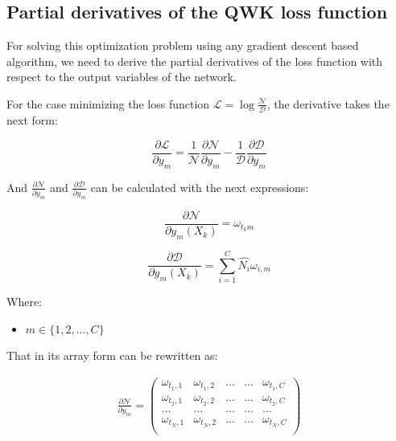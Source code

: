 \documentclass[times,twocolumn,final,authoryear]{elsarticle}
\begin{document}
\subsection{Partial derivatives of the QWK loss function}

For solving this optimization problem using any gradient descent based algorithm, we need to derive the partial derivatives of the loss function with respect to the output variables of the network. 

For the case minimizing the loss function $\mathcal{L} = \log{ \frac{\mathcal{N}}{\mathcal{D}}}$, the derivative takes the next form:

\begin{equation}
\frac{\partial \mathcal{L}}{\partial y_m} = \frac{1}{\mathcal{N}}\frac{\partial \mathcal{N}}{\partial y_m} - \frac{1}{\mathcal{D}}
\frac{\partial{\mathcal{D}}}{\partial y_m}
\end{equation}

And $\frac{\partial \mathcal{N}}{\partial y_m}$ and $\frac{\partial{\mathcal{D}}}{\partial y_m}$ can be calculated with the next expressions:

\begin{equation}
\frac{\partial \mathcal{N}}{\partial y_m(X_k)} = \omega_{t_k m}
\end{equation}

\begin{equation}
\frac{\partial \mathcal{D}}{\partial y_m(X_k)} = \sum_{i=1}^{C} \hat{N_i} \omega_{i,m}
\end{equation}

Where: 
\begin{itemize}
\item[] $m \in \{1, 2, ..., C\}$
\end{itemize}

That in its array form can be rewritten as:


\begin{equation}
\begin{aligned}
\frac{\partial \mathcal{N}}{\partial y_m} =
\begin{pmatrix} 
\omega_{t_1, 1}     & \omega_{t_1, 2}     & ...     & ... & \omega_{t_1, C}\\ 
\omega_{t_2, 1}     & \omega_{t_2, 2}     & ...     & ... & \omega_{t_2, C}\\ 
...					& ...		          & ...     & ... & ...\\
\omega_{t_N, 1}     & \omega_{t_N, 2}     & ...     & ... & \omega_{t_N, C}\\  
\end{pmatrix}
\end{aligned}
\end{equation}
\end{document}
